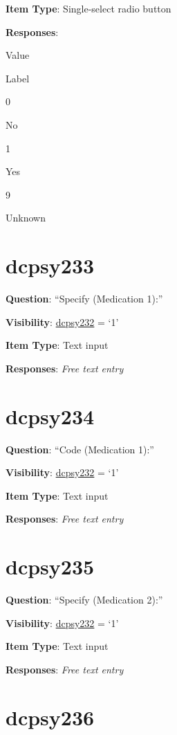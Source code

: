 \documentclass[]{book}
\begin{document}
\textbf{Item Type}: Single-select radio button

\textbf{Responses}:

Value

Label

0

No

1

Yes

9

Unknown

\hypertarget{dcpsy233}{%
\section{dcpsy233}\label{dcpsy233}}

\textbf{Question}: ``Specify (Medication 1):''

\textbf{Visibility}: \protect\hyperlink{dcpsy232}{dcpsy232} = `1'

\textbf{Item Type}: Text input

\textbf{Responses}: \emph{Free text entry}

\hypertarget{dcpsy234}{%
\section{dcpsy234}\label{dcpsy234}}

\textbf{Question}: ``Code (Medication 1):''

\textbf{Visibility}: \protect\hyperlink{dcpsy232}{dcpsy232} = `1'

\textbf{Item Type}: Text input

\textbf{Responses}: \emph{Free text entry}

\hypertarget{dcpsy235}{%
\section{dcpsy235}\label{dcpsy235}}

\textbf{Question}: ``Specify (Medication 2):''

\textbf{Visibility}: \protect\hyperlink{dcpsy232}{dcpsy232} = `1'

\textbf{Item Type}: Text input

\textbf{Responses}: \emph{Free text entry}

\hypertarget{dcpsy236}{%
\section{dcpsy236}\label{dcpsy236}}
\end{document}
